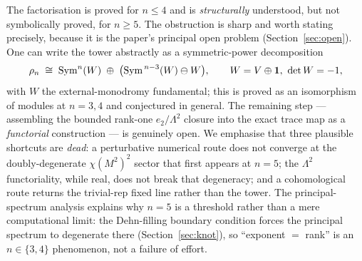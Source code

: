 The factorisation is proved for $n\le4$ and is \emph{structurally} understood, but not
symbolically proved, for $n\ge5$. The obstruction is sharp and worth stating precisely,
because it is the paper's principal open problem (Section~\ref{sec:open}). One can write
the tower abstractly as a symmetric-power decomposition
\begin{equation}\label{eq:symw}
  \rho_n \;\cong\; \operatorname{Sym}^n(W)\;\oplus\;\bigl(\operatorname{Sym}^{\,n-3}(W)\ominus W\bigr),
  \qquad W = V\oplus\mathbf{1},\ \det W=-1,
\end{equation}
with $W$ the external-monodromy fundamental; this is proved as an isomorphism of modules
at $n=3,4$ and conjectured in general. The remaining step --- assembling the bounded
rank-one $e_2/\Lambda^2$ closure into the exact trace map as a \emph{functorial}
construction --- is genuinely open. We emphasise that three plausible shortcuts are
\emph{dead}: a perturbative numerical route does not converge at the doubly-degenerate
$\chi(M^2)^2$ sector that first appears at $n=5$; the $\Lambda^2$ functoriality, while
real, does not break that degeneracy; and a cohomological route returns the trivial-rep
fixed line rather than the tower. The principal-spectrum analysis explains why $n=5$ is a
threshold rather than a mere computational limit: the Dehn-filling boundary condition
forces the principal spectrum to degenerate there (Section~\ref{sec:knot}), so
``exponent $=$ rank'' is an $n\in\{3,4\}$ phenomenon, not a failure of effort.
